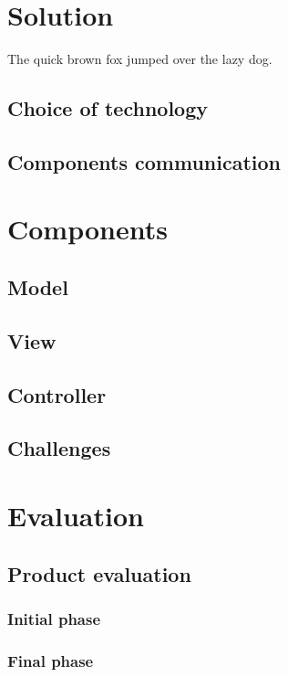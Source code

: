 \documentclass{l4proj}
\begin{document}
\chapter{Solution}
The quick brown fox jumped over the lazy dog.

\section{Choice of technology}

\section{Components communication}

\chapter{Components}

\section{Model}

\section{View}

\section{Controller}

\section{Challenges}

\chapter{Evaluation}

\section{Product evaluation}

\subsection{Initial phase}

\subsection{Final phase}
\end{document}
